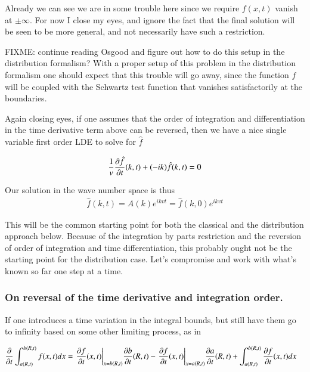Already we can see we are in some trouble here since we require 
$f(x,t)$ vanish at $\pm \infty$.
For now I close my eyes, and ignore the fact that the final solution will be seen to be more 
general, and not necessarily have such a restriction.

FIXME: continue reading Osgood and figure out how to do this setup in the distribution formalism?
With a proper setup of this problem in the distribution formalism one should expect that this trouble will
go away, since the function $f$ will be coupled with the Schwartz test function
that vanishes satisfactorily at the boundaries.

Again closing eyes, if one assumes that the order of integration and
differentiation in the time 
derivative term above can be reversed, then
we have a nice single variable first order LDE to solve for $\hat{f}$

\begin{align}
\inv{v} \PD{t}{\hat{f}}(k,t) + (-ik)\hat{f}(k,t) = 0
\end{align}

Our solution in the wave number space is thus
\begin{align}\label{eqn:distributions:startingPtFirstOrder}
{\hat{f}}(k,t) = A(k) e^{i k v t} = \hat{f}(k,0) e^{i k v t}
\end{align}

This will be the common starting point for both the classical and the distribution approach below.
Because of the integration by parts restriction and the reversion of order of integration and time differentiation, this probably ought not
be the starting point for the distribution case.  Let's compromise and work with what's known so far one step at a time.

\subsubsection{On reversal of the time derivative and integration order. }

If one introduces a time variation
in the integral bounds, but still have them go to infinity based on some
other limiting process, as in

\begin{align*}
\PD{t}{} \int_{a(R,t)}^{b(R,t)} f(x,t) dx
&=
{\left.\PD{t}{f}(x,t)\right\vert}_{x = b(R,t)} \PD{t}{b}(R,t)
-{\left.\PD{t}{f}(x,t)\right\vert}_{x = a(R,t)} \PD{t}{a}(R,t)
+ \int_{a(R,t)}^{b(R,t)} \PD{t}{f}(x,t) dx
\end{align*}

